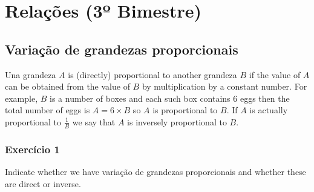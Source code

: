 \chapter{Relações (3º Bimestre)}

\section{Variação de grandezas proporcionais}

Una grandeza $A$ is (directly)
proportional to another grandeza $B$ if the value of $A$
can be obtained from the value of $B$ by multiplication by a constant number.
For example, $B$ is a number of boxes and each such box contains $6$
eggs then the total number of eggs is $A = 6 \times B$ so $A$ is proportional
to $B$. If $A$ is actually proportional to $\frac{1}{B}$ we say that $A$ is
inversely proportional to $B$.

\subsection*{Exercício 1}

Indicate whether we have variação de grandezas proporcionais and whether
these are direct or inverse.


